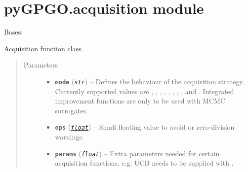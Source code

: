 \documentclass[letterpaper,10pt,english]{sphinxmanual}
\begin{document}
\section{pyGPGO.acquisition module}
\label{pyGPGO.acquisition:module-pyGPGO.acquisition}\label{pyGPGO.acquisition::doc}\label{pyGPGO.acquisition:pygpgo-acquisition-module}

\begin{fulllineitems}
\label{pyGPGO.acquisition:pyGPGO.acquisition.Acquisition}
Bases: \href{https://docs.python.org/2/library/functions.html\#object}{}

Acquisition function class.
\begin{quote}\begin{description}
\item[{Parameters}] \leavevmode\begin{itemize}
\item {} 
\textbf{\texttt{mode}} (\href{https://docs.python.org/2/library/functions.html\#str}{\emph{\texttt{str}}}) -- Defines the behaviour of the acquisition strategy. Currently supported values are
, , ,
, , , , ,
and . Integrated improvement functions are only to be used
with MCMC surrogates.

\item {} 
\textbf{\texttt{eps}} (\href{https://docs.python.org/2/library/functions.html\#float}{\emph{\texttt{float}}}) -- Small floating value to avoid  or zero-division warnings.

\item {} 
\textbf{\texttt{params}} (\href{https://docs.python.org/2/library/functions.html\#float}{\emph{\texttt{float}}}) -- Extra parameters needed for certain acquisition functions, e.g. UCB needs
to be supplied with .

\end{itemize}

\end{description}\end{quote}


\end{fulllineitems}
\end{document}
